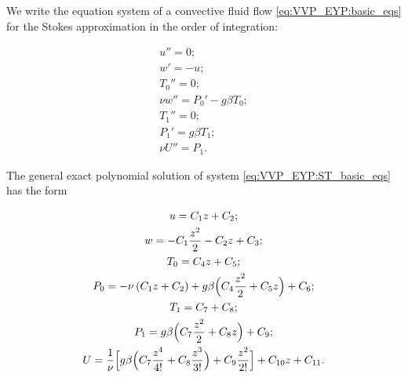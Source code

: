 We write the equation system of a convective fluid flow \eqref{eq:VVP_EYP:basic_eqs} for the Stokes approximation in the order of integration:

\begin{gather}

u''=0;

\\

w' = -u;

\\

T_0''=0;

\\

\nu w''=P_0'-g\beta T_0;        \label{eq:VVP_EYP:ST_basic_eqs}

\\

T_1''=0;

\\

P_1'=g\beta T_1;

\\

\nu U''=P_1.

 \end{gather}

The general exact polynomial solution of system \eqref{eq:VVP_EYP:ST_basic_eqs} has the form

\begin{gather}

u=C_1z+C_2;

\\

w=-C_1\frac{z^2}{2}-C_2 z+ C_3;

\\

T_0=C_4 z + C_5;

\\

       \label{eq:VVP_EYP:General_sol}

P_0 =-\nu \left(C_1 z+ C_2\right) + g\beta \Bigl(C_4\frac{z^2}{2}+C_5z\Bigr)+C_6;

\\

T_1=C_7+C_8;

\\

P_1=g\beta \Bigl(C_7\frac{z^2}{2}+C_8 z\Bigr)+C_9;

\\

U=\frac{1}{\nu}\Bigl[g\beta \Bigl(C_7\frac{z^4}{4!} +C_8 \frac{z^3}{3!}\Bigr)+

C_9 \frac{z^2}{2!}\Bigr]+C_{10} z+ C_{11}.

 \end{gather}

